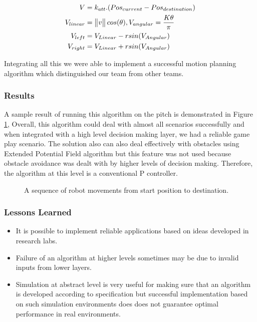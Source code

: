 \begin{align}
V & =k_{att}.(Pos_{current}-Pos_{destination})\\
V_{linear} &= \begin{Vmatrix}v\end{Vmatrix} cos(\theta) ,
V_{angular} = {K\theta \over \pi}\\
V_{left}&=V_{Linear}-rsin(V_{Angular})\\
V_{right}&=V_{Linear}+rsin(V_{Angular})
\end{align}

Integrating all this we were able to implement a successful motion planning algorithm which distinguished our team from other teams.\linebreak

\subsubsection{Results}
A sample result of running this algorithm on the pitch is demonstrated in Figure \ref{fig:seq}, Overall, this algorithm could deal with almost all scenarios successfully and when integrated with a high level decision making layer, we had a reliable game play scenario. 
The solution also can also deal effectively with obstacles using Extended Potential Field algorithm\cite{paper:OKhatib} but this feature was not used because obstacle avoidance was dealt with by higher levels of decision making. Therefore, the algorithm at this level is a conventional P controller.  \linebreak

\begin{figure}[!bp]
\begin{center}
\caption{A sequence of robot movements from start position to destination.}
\label{fig:seq}
\end{center}
\end{figure}

\subsubsection{Lessons Learned}
\begin{itemize}
\item It is possible to implement reliable applications based on ideas developed in research labs. 
\item Failure of an algorithm at higher levels sometimes may be due to invalid inputs from lower layers.
\item Simulation at abstract level is very useful for making sure that an algorithm is developed according to specification but successful implementation based on such simulation environments does does not guarantee optimal performance in real environments.
\end{itemize}